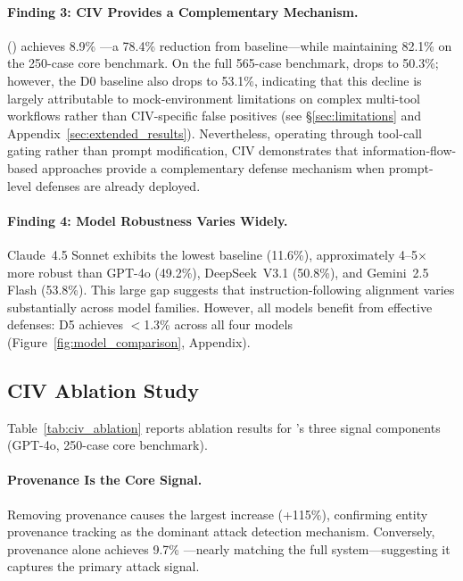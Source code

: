 \paragraph{Finding 3: CIV Provides a Complementary Mechanism.}
 (\civ{}) achieves 8.9\% \asr{}---a 78.4\% reduction from baseline---while maintaining 82.1\% \bsr{} on the 250-case core benchmark.
On the full 565-case benchmark, \bsr{} drops to 50.3\%; however, the D0 baseline also drops to 53.1\%, indicating that this decline is largely attributable to mock-environment limitations on complex multi-tool workflows rather than CIV-specific false positives (see \S\ref{sec:limitations} and Appendix~\ref{sec:extended_results}).
Nevertheless, operating through tool-call gating rather than prompt modification, CIV demonstrates that information-flow-based approaches provide a complementary defense mechanism when prompt-level defenses are already deployed.

\paragraph{Finding 4: Model Robustness Varies Widely.}
Claude~4.5 Sonnet exhibits the lowest baseline \asr{} (11.6\%), approximately 4--5$\times$ more robust than GPT-4o (49.2\%), DeepSeek~V3.1 (50.8\%), and Gemini~2.5 Flash (53.8\%).
This large gap suggests that instruction-following alignment varies substantially across model families.
However, all models benefit from effective defenses: D5 achieves $<$1.3\% \asr{} across all four models (Figure~\ref{fig:model_comparison}, Appendix).

\subsection{CIV Ablation Study}
\label{sec:ablation}

Table~\ref{tab:civ_ablation} reports ablation results for \civ{}'s three signal components (GPT-4o, 250-case core benchmark).



\paragraph{Provenance Is the Core Signal.}
Removing provenance causes the largest \asr{} increase (+115\%), confirming entity provenance tracking as the dominant attack detection mechanism.
Conversely, provenance alone achieves 9.7\% \asr{}---nearly matching the full system---suggesting it captures the primary attack signal.

